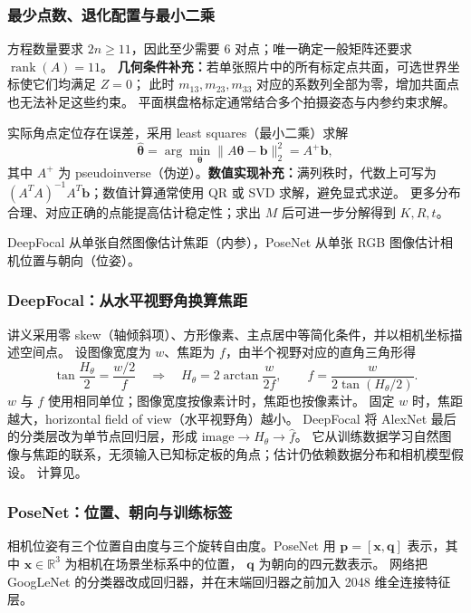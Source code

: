 \subsubsection*{最少点数、退化配置与最小二乘}

方程数量要求 $2n\ge11$，因此至少需要 $\boxed{6}$ 对点；唯一确定一般矩阵还要求
$\operatorname{rank}(A)=11$。
\textbf{几何条件补充：}若单张照片中的所有标定点共面，可选世界坐标使它们均满足 $Z=0$；
此时 $m_{13},m_{23},m_{33}$ 对应的系数列全部为零，增加共面点也无法补足这些约束。
平面棋盘格标定通常结合多个拍摄姿态与内参约束求解。

实际角点定位存在误差，采用 least squares（最小二乘）求解
\[
  \hat{\bm\theta}=\arg\min_{\bm\theta}\|A\bm\theta-\bm b\|_2^2
  =A^+\bm b,
\]
其中 $A^+$ 为 pseudoinverse（伪逆）。\textbf{数值实现补充：}满列秩时，代数上可写为
$(A^TA)^{-1}A^T\bm b$；数值计算通常使用 QR 或 SVD 求解，避免显式求逆。
更多分布合理、对应正确的点能提高估计稳定性；求出 $M$ 后可进一步分解得到 $K,R,t$。


DeepFocal 从单张自然图像估计焦距（内参），PoseNet 从单张 RGB 图像估计相机位置与朝向（位姿）。

\subsubsection*{DeepFocal：从水平视野角换算焦距}

讲义采用零 skew（轴倾斜项）、方形像素、主点居中等简化条件，并以相机坐标描述空间点。
设图像宽度为 $w$、焦距为 $f$，由半个视野对应的直角三角形得
\[
  \tan\frac{H_\theta}{2}=\frac{w/2}{f}
  \quad\Longrightarrow\quad
  \boxed{H_\theta=2\arctan\frac{w}{2f}},
  \qquad
  \boxed{f=\frac{w}{2\tan(H_\theta/2)}}.
\]
$w$ 与 $f$ 使用相同单位；图像宽度按像素计时，焦距也按像素计。
固定 $w$ 时，焦距越大，horizontal field of view（水平视野角）越小。
DeepFocal 将 AlexNet 最后的分类层改为单节点回归层，形成
$\text{image}\to\hat H_\theta\to\hat f$。
它从训练数据学习自然图像与焦距的联系，无须输入已知标定板的角点；估计仍依赖数据分布和相机模型假设。
计算见。

\subsubsection*{PoseNet：位置、朝向与训练标签}

相机位姿有三个位置自由度与三个旋转自由度。PoseNet 用
$\bm p=[\bm x,\bm q]$ 表示，其中 $\bm x\in\mathbb R^3$ 为相机在场景坐标系中的位置，
$\bm q$ 为朝向的四元数表示。
网络把 GoogLeNet 的分类器改成回归器，并在末端回归器之前加入 2048 维全连接特征层。

